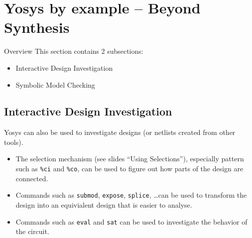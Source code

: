 
\section{Yosys by example -- Beyond Synthesis}

\begin{frame}
\sectionpage
\end{frame}

\begin{frame}{Overview}
This section contains 2 subsections:
\begin{itemize}
\item Interactive Design Investigation
\item Symbolic Model Checking
\end{itemize}
\end{frame}


\subsection{Interactive Design Investigation}

\begin{frame}
\subsectionpage
\subsectionpagesuffix
\end{frame}

\begin{frame}{\subsecname}
Yosys can also be used to investigate designs (or netlists created
from other tools).

\begin{itemize}
\item
The selection mechanism (see slides ``Using Selections''), especially pattern such
as {\tt \%ci} and {\tt \%co}, can be used to figure out how parts of the design
are connected.

\item
Commands such as {\tt submod}, {\tt expose}, {\tt splice}, \dots can be used 
to transform the design into an equivialent design that is easier to analyse.

\item
Commands such as {\tt eval} and {\tt sat} can be used to investigate the
behavior of the circuit.
\end{itemize}
\end{frame}

